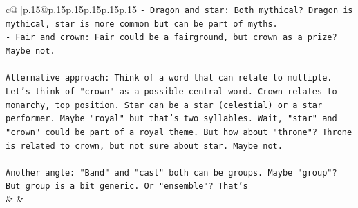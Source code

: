 \documentclass{article}
\begin{document}
{\begin{supertabular}{c@{$\;$}|p{.15\linewidth}@{}p{.15\linewidth}p{.15\linewidth}p{.15\linewidth}p{.15\linewidth}p{.15\linewidth}}
{{{\texttt{{-} Dragon and star: Both mythical? Dragon is mythical, star is more common but can be part of myths.} \\
\texttt{{-} Fair and crown: Fair could be a fairground, but crown as a prize? Maybe not.} \\
\\ 
\texttt{Alternative approach: Think of a word that can relate to multiple. Let's think of "crown" as a possible central word. Crown relates to monarchy, top position. Star can be a star (celestial) or a star performer. Maybe "royal" but that's two syllables. Wait, "star" and "crown" could be part of a royal theme. But how about "throne"? Throne is related to crown, but not sure about star. Maybe not.} \\
\\ 
\texttt{Another angle: "Band" and "cast" both can be groups. Maybe "group"? But group is a bit generic. Or "ensemble"? That's} \\
            }
        }
    }
    & & \\ \\


\end{supertabular}}
\end{document}
